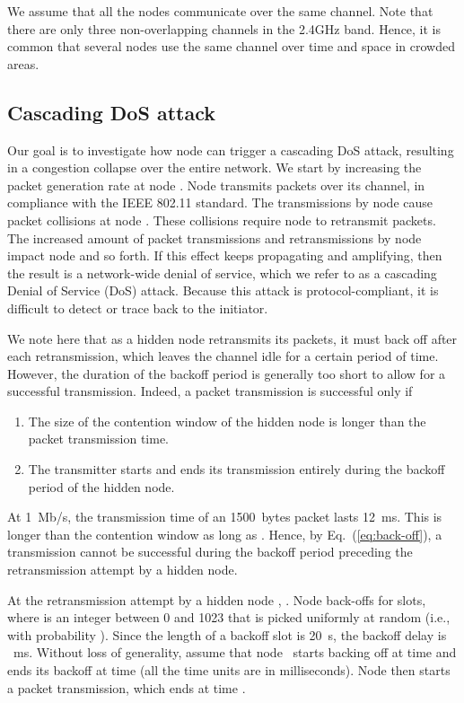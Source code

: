 \documentclass{IEEEtran}
\begin{document}
We assume that all the nodes communicate over the same channel. Note that there are only three non-overlapping channels in the 2.4GHz band.
Hence, it is common that several nodes use the same channel over time and space in crowded areas. 






\subsection{Cascading DoS attack}
Our goal is to investigate how node  can trigger a cascading DoS
attack, resulting in a congestion collapse over the entire network. We start
by increasing the packet generation rate at node
. Node  transmits packets over its channel, in compliance with the IEEE 802.11 standard. The transmissions by
node  cause packet collisions at
node . These collisions require node  to retransmit packets. The increased  amount of packet transmissions and retransmissions by node
 impact node  and so forth. If this effect keeps propagating and amplifying, then the result is a network-wide  denial of service, which
we refer to as a cascading Denial of Service (DoS) attack. Because this attack is protocol-compliant, it is difficult to detect or trace back to the
initiator.

We note here that as  a hidden node retransmits its packets, it must back off after each retransmission, which leaves the channel idle for a certain
period of time. However, the duration of the backoff period is generally too short to allow for a successful transmission.
Indeed, a packet transmission is successful only if
\begin{enumerate}
\item The size of the contention window  of the hidden node is longer than the packet transmission time.
    \item The transmitter starts and ends its transmission entirely during the backoff period of the hidden node.
\end{enumerate}
At 1~Mb/s, the transmission time of an 1500~bytes packet lasts 12~ms. This is longer than
the contention window as long as . Hence, by Eq.~(\ref{eq:back-off}), a transmission cannot be successful during the
backoff period preceding the  retransmission attempt by a hidden node.

At the  retransmission attempt by a hidden node , . Node   back-offs for  slots, where  is an integer between 0 and 1023 that is picked uniformly at random (i.e., with probability ).
Since the length of a backoff slot is 20~s, the backoff delay is ~ms. Without loss of generality, assume that node~ starts backing off at time  and ends its backoff at time  (all the time units are in milliseconds). Node  then starts a packet transmission, which ends at time .
\end{document}
